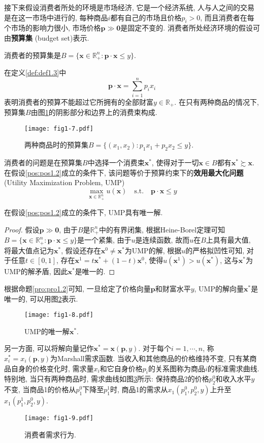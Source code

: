 \documentclass[cn, 12pt, math=mtpro2, bibstyle=apa, blue]{elegantbook}
\newcommand{\R}{\mathbb{R}}
\newcommand{\p}{\mathbf{p}}
\newcommand{\x}{\mathbf{x}}
\begin{document}
接下来假设消费者所处的环境是市场经济, 它是一个经济系统, 人与人之间的交易是在这一市场中进行的, 每种商品$i$都有自己的市场且价格$p_i>0$, 而且消费者在每个市场的影响力很小, 市场价格$\p\gg\mathbf{0}$是固定不变的. 消费者所处经济环境的假设可由\textbf{预算集} (budget set)表示.
\begin{definition}\label{def:def1.3}
消费者的预算集是$B=\{\x\in\R_+^n: \mathbf{p}\cdot\x\leq y\}$.
\end{definition}
在定义\ref{def:def1.3}中
$$\p\cdot\x=\sum_{i=1}^{n}p_ix_i$$
表明消费者的预算不能超过它所拥有的全部财富$y\in \R_+$. 在只有两种商品的情况下, 预算集$B$由图\ref{fig1.7}的阴影部分和边界上的消费束构成.
\begin{figure}[htbp!]
  \centering
  \texttt{[image: fig1-7.pdf]}
  \caption{两种商品时的预算集$B=\{(x_1,x_2): p_1x_1+p_2x_2\leq y\}$.}\label{fig1.7}
\end{figure}

消费者的问题是在预算集$B$中选择一个消费束$\x^\ast$, 使得对于一切$\x\in B$都有$\x^\ast\succsim \x$. 在假设\ref{pos:pos1.2}成立的条件下, 该问题等价于预算约束下的\textbf{效用最大化问题} (Utility Maximization Problem, UMP)
\begin{equation}\label{eq1.3}
  \max_{\x\in\R^n_+} u(\x)\quad \text{s.t.}\quad \p\cdot\x\leq y
\end{equation}
\begin{proposition}\label{pro:pro1.2}
在假设\ref{pos:pos1.2}成立的条件下, UMP具有唯一解.
\end{proposition}
\begin{proof}
  假设$\p\gg\mathbf{0}$, 由于$B$是$\R^n_+$中的有界闭集, 根据Heine-Borel定理可知$B=\{\x\in\R_+^n:\p\cdot\x\leq y\}$是一个紧集, 由于$u$是连续函数, 故而$u$在$B$上具有最大值, 将最大值点记为$\x^\ast$, 假设还存在$\x^0\neq \x^\ast$为UMP的解, 根据$u$的严格拟凹性可知, 对于任意$t\in [0,1]$, 存在$\x^1=t\x^\ast+(1-t)\x^0$, 使得$u(\x^1)>u(\x^\ast)$, 这与$\x^\ast$为UMP的解矛盾, 因此$\x^\ast$是唯一的.
\end{proof}
根据命题\ref{pro:pro1.2}可知, 一旦给定了价格向量$\p$和财富水平$y$, UMP的解向量$\x^\ast$是唯一的, 可以用图\ref{fig1.8}表示.
\begin{figure}[htbp!]
  \centering
  \texttt{[image: fig1-8.pdf]}
  \caption{UMP的唯一解$\x^\ast$.}\label{fig1.8}
\end{figure}

另一方面, 可以将解向量记作$\x^\ast=\x(\p,y)$. 对于每个$i=1,\cdots,n$, 称$x_i^\ast=x_i(\p,y)$为Marshall需求函数. 当收入和其他商品的价格维持不变, 只有某商品自身的价格变化时, 需求量$x_i$和它自身价格$p_i$的关系图称为商品$i$的标准需求曲线. 特别地, 当只有两种商品时, 需求曲线如图\ref{fig1.9}所示: 保持商品2的价格$p_2^0$和收入水平$y$不变, 当商品1的价格从$p_1^0$下降至$p_1^1$时, 商品1的需求从$x_1(p_1^0,p_2^0,y)$上升至$x_1(p_1^1,p_2^0,y)$.
\begin{figure}[htbp!]
  \centering
  \texttt{[image: fig1-9.pdf]}
  \caption{消费者需求行为.}\label{fig1.9}
\end{figure}
\end{document}
